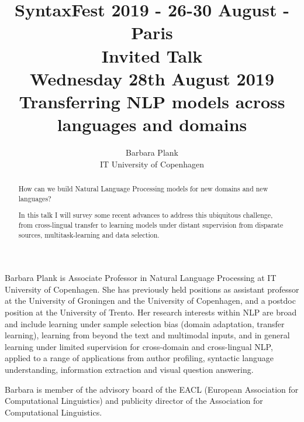 \documentclass[11pt]{article}
\title{{\footnotesize SyntaxFest 2019 - 26-30 August - Paris}\\
\vspace{10mm}
  Invited Talk\\
  {\small Wednesday 28th August 2019}\\
  Transferring NLP models across languages and domains}
\author{Barbara Plank\\
  IT University of Copenhagen}
\begin{document}
\maketitle
\begin{abstract}
  How can we build Natural Language Processing models for new domains
  and new languages?

  In this talk I will survey some recent advances to
address this ubiquitous challenge, from cross-lingual transfer to
learning models under distant supervision from disparate sources,
multitask-learning and data selection.
\end{abstract}

\vspace{4mm}
\begin{shortbio}
  Barbara Plank is Associate Professor in Natural Language Processing at
IT University of Copenhagen.
She has previously held positions as assistant professor at the
University of Groningen and the University of
Copenhagen, and a postdoc position at the University of Trento. Her
research interests within NLP are broad and include learning under
sample
selection bias (domain adaptation, transfer learning), learning from
beyond the text and multimodal inputs, and in general learning under
limited supervision
for cross-domain and cross-lingual NLP, applied to a range of
applications from author profiling, syntactic language understanding,
information extraction and visual question answering.

Barbara is
member of the advisory board of the EACL (European Association for Computational
Linguistics) and publicity director of the Association for
Computational Linguistics.
\end{shortbio}
\end{document}
